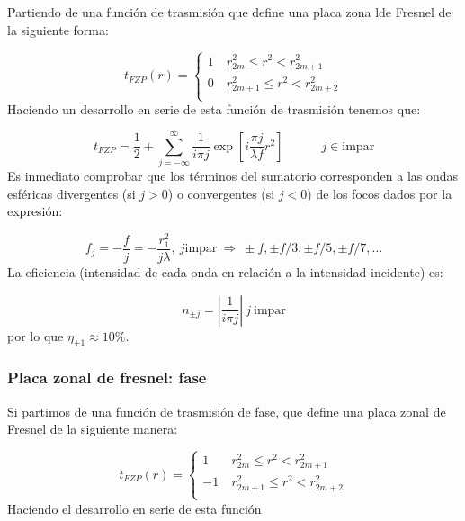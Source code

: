 \documentclass[12pt,a4paper]{book}
\numberwithin{equation}{section}
\numberwithin{figure}{section}
\newcommand{\tquad}{\quad \quad \quad}
\newcommand{\ccorchetes}[1]{\left[ #1  \right]}
\newcommand{\1}{_{(1)}}
\newcommand{\2}{_{(2)}}
\theoremstyle{definition}
\begin{document}
Partiendo de una función de trasmisión que define una placa zona lde Fresnel de la siguiente forma:

\begin{equation}
    t_{FZP} (r) = \left\lbrace \begin{array}{ll}
       1  &  \ r_{2m}^2 \leq r^2 < r_{2m+1}^2 \\
       0  &  \ r_{2m+1}^2 \leq r^2 < r_{2m+2}^2 \\
    \end{array} \right.
\end{equation}
Haciendo un desarrollo en serie de esta función de trasmisión tenemos que:

\begin{equation}
    t_{FZP} = \frac{1}{2} + \sum_{j = - \infty}^{\infty} \frac{1}{i \pi j} \exp \ccorchetes{i \frac{\pi j}{\lambda f} r^2} \tquad  j \in \text{impar}
\end{equation}
Es inmediato comprobar que los términos del sumatorio corresponden a las ondas esféricas divergentes (si $j>0$) o convergentes (si $j<0$) de los focos dados por la expresión:

\begin{equation}
    f_j = - \frac{f}{j} = - \frac{r_1^2}{j \lambda}, \ j \text{impar} \ \Rightarrow \ \pm f,\pm f/3,\pm f/5, \pm f/7, \ldots
\end{equation}
La eficiencia (intensidad de cada onda en relación a la intensidad incidente) es:

\begin{equation}
    n_{\pm j} = \left| \frac{1}{i\pi j} \right|  \ j \ \text{impar}
\end{equation}
por lo que $\eta_{\pm 1} \approx 10\%$.


\subsubsection{Placa zonal de fresnel: fase}

Si partimos de una función de trasmisión de fase, que define una placa zonal de Fresnel de la siguiente manera:

\begin{equation}
    t_{FZP} (r) = \left\lbrace \begin{array}{ll}
       1  &  \ r_{2m}^2 \leq r^2 < r_{2m+1}^2 \\
       -1  &  \ r_{2m+1}^2 \leq r^2 < r_{2m+2}^2 \\
    \end{array} \right.
\end{equation}
Haciendo el desarrollo en serie de esta función 
\end{document}
